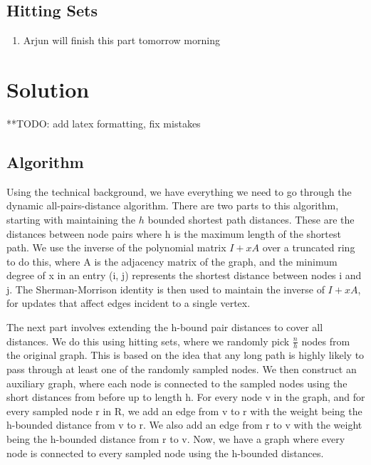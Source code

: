 \documentclass[12pt]{article}
\begin{document}
\subsection{Hitting Sets} \label{sec:3.5}

\begin{enumerate}
    \item Arjun will finish this part tomorrow morning
\end{enumerate}

\section{Solution} \label{sec:4}

**TODO: add latex formatting, fix mistakes

\subsection{Algorithm}

Using the technical background, we have everything we need to go through the dynamic all-pairs-distance algorithm. There are two parts to this algorithm, starting with maintaining the $h$ bounded shortest path distances. These are the distances between node pairs where h is the maximum length of the shortest path. We use the inverse of the polynomial matrix $I + xA$ over a truncated ring to do this, where A is the adjacency matrix of the graph, and the minimum degree of x in an entry (i, j) represents the shortest distance between nodes i and j. The Sherman-Morrison identity is then used to maintain the inverse of $I + xA$, for updates that affect edges incident to a single vertex.

The next part involves extending the h-bound pair distances to cover all distances. We do this using hitting sets, where we randomly pick $\frac{n}{h}$ nodes from the original graph. This is based on the idea that any long path is highly likely to pass through at least one of the randomly sampled nodes. We then construct an auxiliary graph, where each node is connected to the sampled nodes using the short distances from before up to length h. For every node v in the graph, and for every sampled node r in R, we add an edge from v to r with the weight being the h-bounded distance from v to r. We also add an edge from r to v with the weight being the h-bounded distance from r to v. Now, we have a graph where every node is connected to every sampled node using the h-bounded distances.
\end{document}
